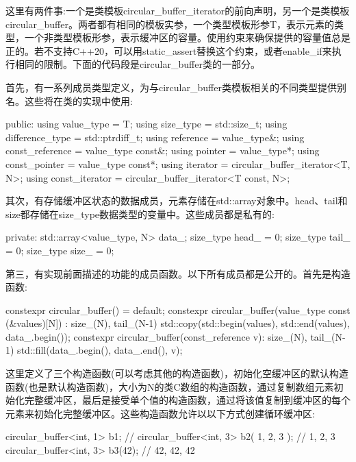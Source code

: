 这里有两件事:一个是类模板circular\_buffer\_iterator的前向声明，另一个是类模板circular\_buffer。两者都有相同的模板实参，一个类型模板形参T，表示元素的类型，一个非类型模板形参，表示缓冲区的容量。使用约束来确保提供的容量值总是正的。若不支持C++20，可以用static\_assert替换这个约束，或者enable\_if来执行相同的限制。下面的代码段是circular\_buffer类的一部分。

首先，有一系列成员类型定义，为与circular\_buffer类模板相关的不同类型提供别名。这些将在类的实现中使用:

\begin{cpp}
	public:
	using value_type = T;
	using size_type = std::size_t;
	using difference_type = std::ptrdiff_t;
	using reference = value_type&;
	using const_reference = value_type const&;
	using pointer = value_type*;
	using const_pointer = value_type const*;
	using iterator = circular_buffer_iterator<T, N>;
	using const_iterator =
	circular_buffer_iterator<T const, N>;
\end{cpp}

其次，有存储缓冲区状态的数据成员，元素存储在std::array对象中。head、tail和size都存储在size\_type数据类型的变量中。这些成员都是私有的:

\begin{cpp}
private:
	std::array<value_type, N> data_;
	size_type head_ = 0;
	size_type tail_ = 0;
	size_type size_ = 0;
\end{cpp}

第三，有实现前面描述的功能的成员函数。以下所有成员都是公开的。首先是构造函数:

\begin{cpp}
constexpr circular_buffer() = default;
constexpr circular_buffer(value_type const (&values)[N]) :
	size_(N), tail_(N-1)
{
	std::copy(std::begin(values), std::end(values),
	data_.begin());
}
constexpr circular_buffer(const_reference v):
	size_(N), tail_(N-1)
{
	std::fill(data_.begin(), data_.end(), v);
}
\end{cpp}

这里定义了三个构造函数(可以考虑其他的构造函数)，初始化空缓冲区的默认构造函数(也是默认构造函数)，大小为N的类C数组的构造函数，通过复制数组元素初始化完整缓冲区，最后是接受单个值的构造函数，通过将该值复制到缓冲区的每个元素来初始化完整缓冲区。这些构造函数允许以以下方式创建循环缓冲区:

\begin{cpp}
circular_buffer<int, 1> b1; // {}
circular_buffer<int, 3> b2({ 1, 2, 3 }); // {1, 2, 3}
circular_buffer<int, 3> b3(42); // {42, 42, 42}
\end{cpp}

